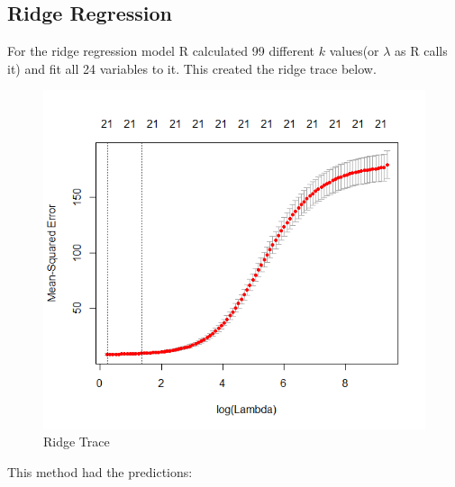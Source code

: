 \subsection*{Ridge Regression}
For the ridge regression model R calculated 99 different $k$ values(or $\lambda$ as R calls it) and fit all 24 variables to it. This created the ridge trace below.
\newpage
\begin{figure}
	\centering
	\includegraphics[width=0.7\linewidth]{RidgeTrace}
	\caption{Ridge Trace}
	\label{fig:ridgetrace}
\end{figure}
\newpage
This method had the predictions: \newpage
